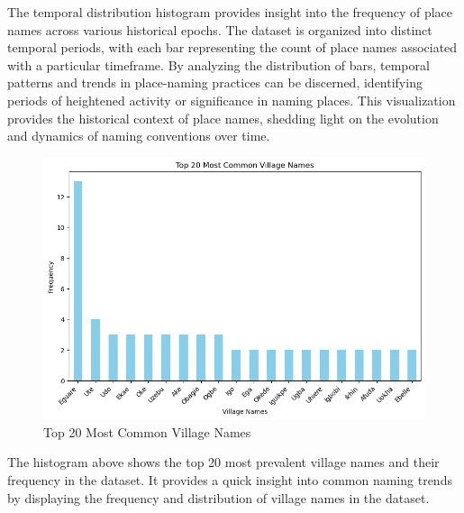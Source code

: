 The temporal distribution histogram provides insight into the frequency of place names across various historical epochs. The dataset is organized into distinct temporal periods, with each bar representing the count of place names associated with a particular timeframe. By analyzing the distribution of bars, temporal patterns and trends in place-naming practices can be discerned, identifying periods of heightened activity or significance in naming places. This visualization provides the historical context of place names, shedding light on the evolution and dynamics of naming conventions over time.



\begin{figure}[H]
    \centering
    \includegraphics[width=1\linewidth]{histogram2.png}
    \caption{Top 20 Most Common Village Names}
    \label{fig:histogram2}
\end{figure}

The histogram above shows the top 20 most prevalent village names and their frequency in the dataset. It provides a quick insight into common naming trends by displaying the frequency and distribution of village names in the dataset.



